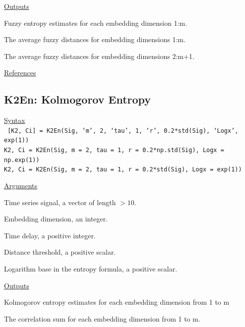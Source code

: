 \documentclass[12pt, a4paper, titlepage, openany]{book}
\begin{document}
\noindent \ul{Outputs}
\begin{description}[labelsep=1cm, labelwidth=2cm, nosep]\footnotesize
\item[\texttt{Fuzz}]	Fuzzy entropy estimates for each embedding dimension 1:m.
\item[\texttt{Ps1}]		The average fuzzy distances for embedding dimensions 1:m.
\item[\texttt{Ps2}]		The average fuzzy distances for embedding dimensions 2:m+1.
\end{description}

\noindent \ul{References}\hspace{1cm}
\cite{Fuzz1} \cite{Fuzz2}



\newpage
\subsection{\normalsize K2En: \hspace{15mm}  Kolmogorov Entropy}
\noindent\ul{Syntax} \vspace{6mm} \\ \noindent \texttt{\footnotesize
[K2, Ci] = K2En(Sig, ‘m’, 2, ‘tau’, 1, ‘r’, 0.2*std(Sig), ‘Logx’, exp(1)) \\
K2, Ci  = K2En(Sig, m = 2, tau = 1, r = 0.2*np.std(Sig), Logx = np.exp(1)) \\
K2, Ci  = K2En(Sig, m = 2, tau = 1, r = 0.2*std(Sig), Logx = exp(1))}

\noindent \ul{Arguments}
\begin{description}[labelsep=1cm, labelwidth=2cm, nosep, style=multiline,leftmargin=3cm]\footnotesize
\item[\texttt{Sig}]		Time series signal, a vector of length $> 10$.
\item[\texttt{m}]		Embedding dimension, an integer.
\item[\texttt{tau}]		Time delay, a positive integer.
\item[\texttt{r}]		Distance threshold, a positive scalar.
\item[\texttt{Logx}]	Logarithm base in the entropy formula, a positive scalar.
\end{description}

\noindent \ul{Outputs}
\begin{description}[labelsep=1cm, labelwidth=2cm, nosep, style=multiline,leftmargin=3cm]\footnotesize
\item[\texttt{K2}]		Kolmogorov entropy estimates for each embedding dimension from 1 to m
\item[\texttt{Ci}]		The correlation sum for each embedding dimension from 1 to m.
\end{description}
\end{document}
